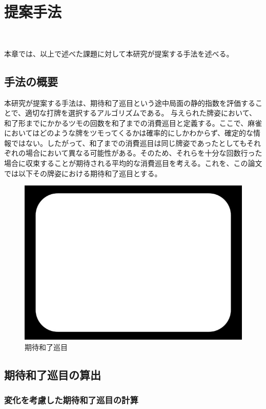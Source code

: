 \chapter{提案手法}　%
\label{chap:approach}

本章では、以上で述べた課題に対して本研究が提案する手法を述べる。

\section{手法の概要}
本研究が提案する手法は、期待和了巡目という途中局面の静的指数を評価することで、適切な打牌を選択するアルゴリズムである。
与えられた牌姿において、和了形までにかかるツモの回数を和了までの消費巡目と定義する。ここで、麻雀においてはどのような牌をツモってくるかは確率的にしかわからず、確定的な情報ではない。したがって、和了までの消費巡目は同じ牌姿であったとしてもそれぞれの場合において異なる可能性がある。そのため、それらを十分な回数行った場合に収束することが期待される平均的な消費巡目を考える。これを、この論文では以下その牌姿における期待和了巡目とする。

\begin{figure}[h]
 \centering
 \includegraphics[keepaspectratio, scale=0.5,bb=0 0 620 439]
      {img/zu.jpg}
 \caption{期待和了巡目}
 \label{zu}
\end{figure}

\section{期待和了巡目の算出}

\subsection{変化を考慮した期待和了巡目の計算}

